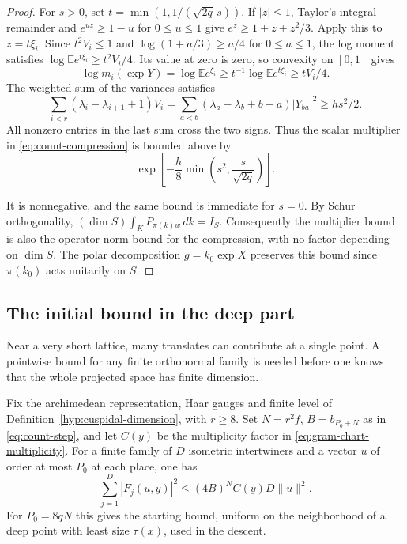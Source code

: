 \begin{proof}
For \(s>0\), set \(t=\min(1,1/(\sqrt{2q}\,s))\). If \(|z|\le1\),
Taylor's integral remainder and \(e^{uz}\ge1-u\) for \(0\le u\le1\)
give \(e^z\ge1+z+z^2/3\). Apply this to \(z=t\xi_i\). Since
\(t^2V_i\le1\) and \(\log(1+a/3)\ge a/4\) for \(0\le a\le1\),
the log moment satisfies \(\log\mathbb E e^{t\xi_i}\ge t^2 V_i/4\).
Its value at zero is zero, so convexity on \([0,1]\) gives
\[
 \log m_i(\exp Y)=\log\mathbb E e^{\xi_i}
       \ge t^{-1}\log\mathbb E e^{t\xi_i}\ge tV_i/4 .
\] The weighted sum of
the variances satisfies
\[
 \sum_{i<r}(\lambda_i-\lambda_{i+1}+1)V_i
 = \sum_{a<b}(\lambda_a-\lambda_b+b-a)|Y_{ba}|^2
 \ge h s^2/2 .
\]
All nonzero entries in the last sum cross the two signs. Thus the
scalar multiplier in \eqref{eq:count-compression} is bounded above by
\begin{equation}\label{eq:count-polar-decay}
      \exp\!\left[-\frac h8\min\!\left(s^2,\frac{s}{\sqrt{2q}}\right)\right].
\end{equation}

It is nonnegative, and the same bound is immediate for \(s=0\).
By Schur orthogonality,
\((\dim S)\int_K P_{\pi(k)w}\,dk=I_S\). Consequently the multiplier
bound is also the operator norm bound for the compression, with no
factor depending on \(\dim S\). The polar decomposition \(g=k_0\exp X\)
preserves this bound since \(\pi(k_0)\) acts unitarily on \(S\).

\end{proof}

\subsection{The initial bound in the deep part}\label{sec:count-sobolev}

Near a very short lattice, many translates can contribute at a single point. A pointwise bound for any finite orthonormal family is needed before one knows that the whole projected space has finite dimension.

\begin{proposition}\label{prop:initial-point-evaluation}
Fix the archimedean representation, Haar gauges and finite level of
Definition~\ref{hyp:cuspidal-dimension}, with \(r\ge8\).
Set \(N=r^2 f\), \(B=b_{P_0+N}\) as in \eqref{eq:count-step}, and
let \(C(y)\) be the multiplicity factor in \eqref{eq:gram-chart-multiplicity}.
For a finite family of \(D\) isometric intertwiners and a vector \(u\)
of order at most \(P_0\) at each place, one has
\[
 \sum_{j=1}^D |F_j(u,y)|^2\le (4B)^N C(y)D\|u\|^2 .
\]
For \(P_0=8qN\) this gives the starting bound, uniform on the
neighborhood of a deep point with least size \(\tau(x)\), used
in the descent.
\end{proposition}

